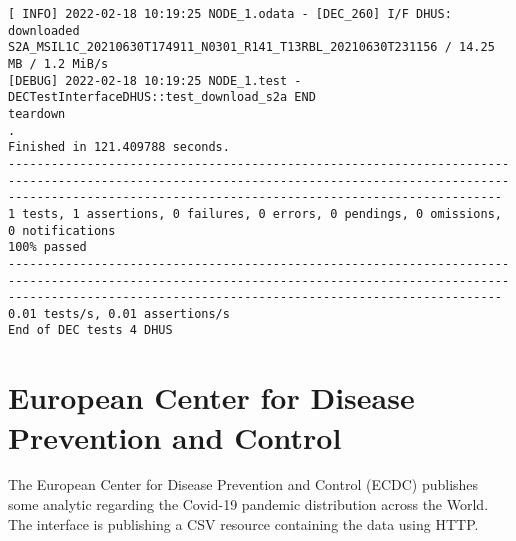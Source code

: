 \documentclass[dec_sum_main.tex]{subfiles}
\begin{document}
\begin{Verbatim}[fontsize=\tiny]
[ INFO] 2022-02-18 10:19:25 NODE_1.odata - [DEC_260] I/F DHUS: downloaded S2A_MSIL1C_20210630T174911_N0301_R141_T13RBL_20210630T231156 / 14.25 MB / 1.2 MiB/s
[DEBUG] 2022-02-18 10:19:25 NODE_1.test - DECTestInterfaceDHUS::test_download_s2a END
teardown
.
Finished in 121.409788 seconds.
-----------------------------------------------------------------------------------------------------------------------------------------------------------------------------------------------------------------
1 tests, 1 assertions, 0 failures, 0 errors, 0 pendings, 0 omissions, 0 notifications
100% passed
-----------------------------------------------------------------------------------------------------------------------------------------------------------------------------------------------------------------
0.01 tests/s, 0.01 assertions/s
End of DEC tests 4 DHUS
\end{Verbatim}

\pagebreak


\section{European Center for Disease Prevention and Control }

The European Center for Disease Prevention and Control (ECDC) publishes some analytic regarding the Covid-19 pandemic distribution across the World. The interface is publishing  a CSV resource containing the data using HTTP.\newline  


	
 \newline
\end{document}
